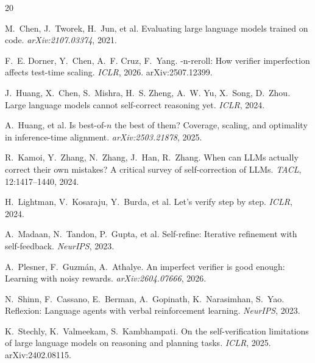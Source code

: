 \documentclass[11pt]{article}
\begin{document}
\begin{thebibliography}{20}

M.~Chen, J.~Tworek, H.~Jun, et al.
\newblock Evaluating large language models trained on code.
\newblock \emph{arXiv:2107.03374}, 2021.

F.~E. Dorner, Y.~Chen, A.~F. Cruz, F.~Yang.
-n-reroll: How verifier imperfection affects
test-time scaling.
\newblock \emph{ICLR}, 2026. arXiv:2507.12399.

J.~Huang, X.~Chen, S.~Mishra, H.~S. Zheng, A.~W. Yu, X.~Song,
D.~Zhou.
\newblock Large language models cannot self-correct reasoning yet.
\newblock \emph{ICLR}, 2024.

A.~Huang, et al.
\newblock Is best-of-$n$ the best of them? Coverage, scaling, and
optimality in inference-time alignment.
\newblock \emph{arXiv:2503.21878}, 2025.

R.~Kamoi, Y.~Zhang, N.~Zhang, J.~Han, R.~Zhang.
\newblock When can {LLM}s actually correct their own mistakes? {A}
critical survey of self-correction of {LLM}s.
\newblock \emph{TACL}, 12:1417--1440, 2024.

H.~Lightman, V.~Kosaraju, Y.~Burda, et al.
\newblock Let's verify step by step.
\newblock \emph{ICLR}, 2024.

A.~Madaan, N.~Tandon, P.~Gupta, et al.
\newblock Self-refine: Iterative refinement with self-feedback.
\newblock \emph{NeurIPS}, 2023.

A.~Plesner, F.~Guzm\'an, A.~Athalye.
\newblock An imperfect verifier is good enough: Learning with noisy
rewards.
\newblock \emph{arXiv:2604.07666}, 2026.

N.~Shinn, F.~Cassano, E.~Berman, A.~Gopinath, K.~Narasimhan,
S.~Yao.
\newblock Reflexion: Language agents with verbal reinforcement
learning.
\newblock \emph{NeurIPS}, 2023.

K.~Stechly, K.~Valmeekam, S.~Kambhampati.
\newblock On the self-verification limitations of large language
models on reasoning and planning tasks.
\newblock \emph{ICLR}, 2025. arXiv:2402.08115.


\end{thebibliography}
\end{document}
